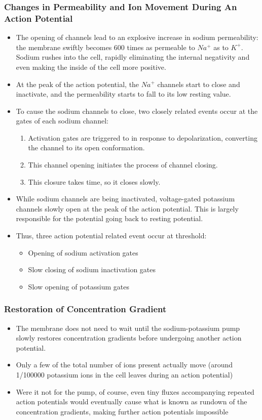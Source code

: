 \documentclass{article}
\numberwithin{equation}{section}
\begin{document}
\subsubsection{Changes in Permeability and Ion Movement During An Action Potential}
\begin{itemize}
    \item The opening of channels lead to an explosive increase in sodium permeability: the membrane swiftly becomes 600 times as permeable to $Na^+$ as to $K^+$. Sodium rushes into the cell, rapidly eliminating the internal negativity and even making the inside of the cell more positive.
    \item At the peak of the action potential, the $Na^+$ channels start to close and inactivate, and the permeability starts to fall to its low resting value.
    \item To cause the sodium channels to close, two closely related events occur at the gates of each sodium channel:
    \begin{enumerate}
        \item Activation gates are triggered to  in response to depolarization, converting the channel to its open conformation.
        \item This channel opening initiates the process of channel closing.
        \item This closure takes time, so it closes slowly.
    \end{enumerate}
    \item While sodium channels are being inactivated, voltage-gated potassium channels slowly open at the peak of the action potential. This is largely responsible for the potential going back to resting potential.
    \item Thus, three action potential related event occur at threshold:
    \begin{itemize}
        \item Opening of sodium activation gates
        \item Slow closing of sodium inactivation gates
        \item Slow opening of potassium gates
    \end{itemize} 
\end{itemize}
\subsubsection{Restoration of Concentration Gradient}
\begin{itemize}
    \item The membrane does not need to wait until the sodium-potassium pump slowly restores concentration gradients before undergoing another action potential.
    \item Only a few of the total number of ions present actually move (around 1/100000 potassium ions in the cell leaves during an action potential)
    \item Were it not for the pump, of course, even tiny fluxes accompanying repeated action potentials would eventually cause what is known as rundown of the concentration gradients, making further action potentials impossible
\end{itemize}
\end{document}
